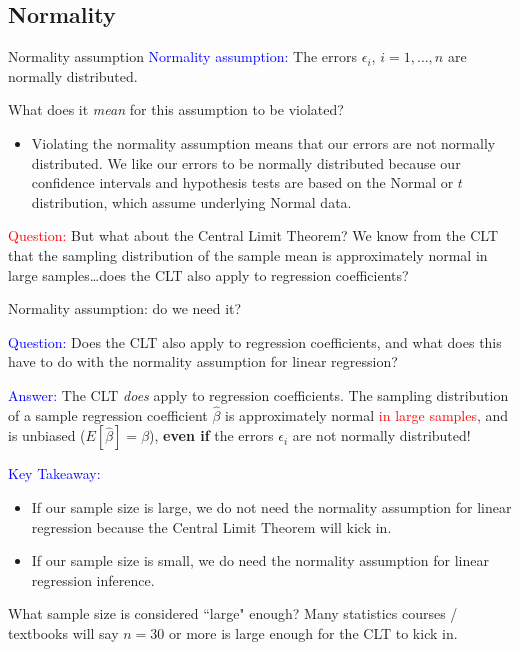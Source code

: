 \documentclass[10pt,t]{beamer}
\begin{document}
\subsection{Normality}

\begin{frame}{Normality assumption}
\textcolor{blue}{Normality assumption:} The errors $\epsilon_i$, $i = 1, \dots, n$ are normally distributed.

\vspace{0.3cm}

What does it \textit{mean} for this assumption to be violated?

\vspace{0.3cm}

\begin{itemize}
	\item[] Violating the normality assumption means that our errors are not normally distributed. We like our errors to be normally distributed because our confidence intervals and hypothesis tests are based on the Normal or $t$ distribution, which assume underlying Normal data. \pause
\end{itemize}

\vspace{0.3cm} 
\textcolor{red}{Question:} But what about the Central Limit Theorem? We know from the CLT that the sampling distribution of the sample mean is approximately normal in large samples\dots does the CLT also apply to regression coefficients?

\end{frame}

\begin{frame}{Normality assumption: do we need it?}

\textcolor{blue}{Question:} Does the CLT also apply to regression coefficients, and what does this have to do with the normality assumption for linear regression?

\vspace{0.3cm} 

\textcolor{blue}{Answer:} The CLT \textit{does} apply to regression coefficients. The sampling distribution of a sample regression coefficient $\hat{\beta}$ is approximately normal \textcolor{red}{in large samples}, and is unbiased ($E[\hat{\beta}] = \beta$), \textbf{even if} the errors $\epsilon_i$ are not normally distributed! \pause

\vspace{0.3cm} 

\textcolor{blue}{Key Takeaway:} 
\begin{itemize}
	\item If our sample size is large, we do not need the normality assumption for linear regression because the Central Limit Theorem will kick in.
	\item If our sample size is small, we do need the normality assumption for linear regression inference.
\end{itemize}

\small What sample size is considered ``large" enough? Many statistics courses / textbooks will say $n = 30$ or more is large enough for the CLT to kick in. 

\end{frame}
\end{document}
